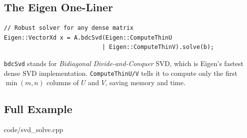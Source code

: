 \subsection{The Eigen One-Liner}

\begin{lstlisting}
// Robust solver for any dense matrix
Eigen::VectorXd x = A.bdcSvd(Eigen::ComputeThinU
                            | Eigen::ComputeThinV).solve(b);
\end{lstlisting}

\texttt{bdcSvd} stands for \emph{Bidiagonal Divide-and-Conquer} SVD,
which is Eigen's fastest dense SVD implementation.
\texttt{ComputeThinU/V} tells it to compute only the first
$\min(m,n)$ columns of $U$ and $V$, saving memory and time.

\subsection{Full Example}


                {code/svd_solve.cpp}
